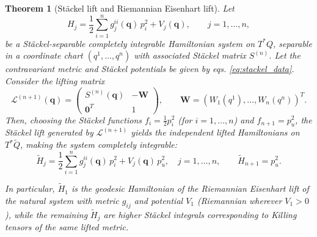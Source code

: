 \documentclass[10pt]{amsart}
\numberwithin{equation}{section}
\newtheorem{theorem}{Theorem}
\theoremstyle{definition}
\begin{document}
\begin{theorem}[Stäckel lift and Riemannian Eisenhart lift]\label{theo:1}
	Let
	\begin{equation}\label{eq:H}
		H_j = \frac{1}{2}\sum_{i=1}^n g^{ii}_j(\boldsymbol{q})\, p_i^2 + V_j(\boldsymbol{q}), \qquad j=1,\ldots,n,
	\end{equation}
	be a Stäckel-separable completely integrable Hamiltonian system on $T^{*}Q$, separable in a coordinate chart
	$(q^1,\ldots,q^n)$ with associated Stäckel matrix $S^{(n)}$.
	Let the contravariant metric and Stäckel potentials be given by eqs.
	\eqref{eq:stackel_data}.
	Consider the lifting matrix
	\begin{equation}\label{eq:lifting-matrix}
		\mathcal{L}^{(n+1)}(\boldsymbol{q})=
		\begin{pmatrix}
			S^{(n)}(\boldsymbol{q}) & -\boldsymbol{W} \\
			\boldsymbol{0}^T & 1
		\end{pmatrix},
		\qquad
		\boldsymbol{W}=(W_1(q^1),\ldots,W_n(q^n))^T .
	\end{equation}
	Then, choosing the Stäckel functions $f_i = \frac{1}{2}p_i^2$ (for $i=1,\ldots,n$) and $f_{n+1} = p_u^2$, the Stäckel lift generated by $\mathcal{L}^{(n+1)}$ yields the independent lifted Hamiltonians on $T^{*}\tilde{Q}$, making the system completely integrable: 
	\begin{equation}\label{eq:lifted-H}
		\tilde H_j
		= \frac{1}{2}\sum_{i=1}^n g^{ii}_j(\boldsymbol{q})\, p_i^2
		+ V_j(\boldsymbol{q})\, p_u^2, \quad j=1,\ldots,n,\qquad \tilde{H}_{n+1}=p_u^2.
	\end{equation}
	
	
In particular, $\tilde H_1$ is the geodesic Hamiltonian of the Riemannian Eisenhart lift of the natural system with metric $g_{ij}$ and potential $V_1$ (Riemannian wherever $V_1>0$), while the remaining $\tilde H_j$ are higher Stäckel integrals corresponding to Killing tensors of the same lifted metric.
\end{theorem}
\end{document}
